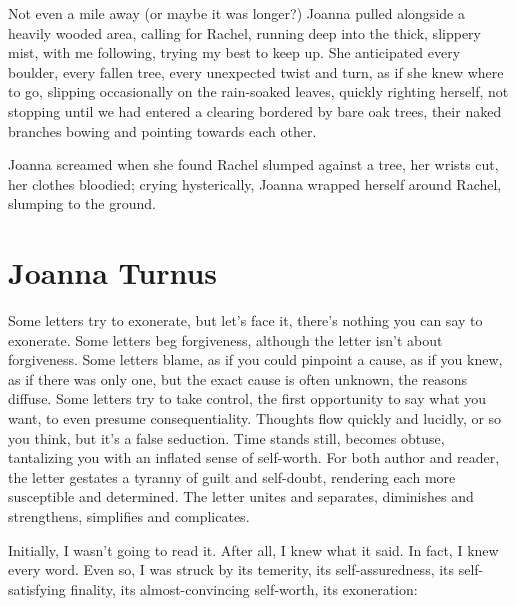 Not even a mile away (or maybe it was longer?) Joanna pulled alongside a
heavily wooded area, calling for Rachel, running deep into the thick,
slippery mist, with me following, trying my best to keep up. She
anticipated every boulder, every fallen tree, every unexpected twist and
turn, as if she knew where to go, slipping occasionally on the
rain-soaked leaves, quickly righting herself, not stopping until we had
entered a clearing bordered by bare oak trees, their naked branches
bowing and pointing towards each other.

Joanna screamed when she found Rachel slumped against a tree, her wrists
cut, her clothes bloodied; crying hysterically, Joanna wrapped herself
around Rachel, slumping to the ground.

\chapter{Joanna Turnus}

\titlemark

Some letters try to exonerate, but let's face it, there's nothing you
can say to exonerate. Some letters beg forgiveness, although the letter
isn't about forgiveness. Some letters blame, as if you could pinpoint a
cause, as if you knew, as if there was only one, but the exact cause is
often unknown, the reasons diffuse. Some letters try to take control,
the first opportunity to say what you want, to even presume
consequentiality. Thoughts flow quickly and lucidly, or so you think,
but it's a false seduction. Time stands still, becomes obtuse,
tantalizing you with an inflated sense of self-worth. For both author
and reader, the letter gestates a tyranny of guilt and self-doubt,
rendering each more susceptible and determined. The letter unites and
separates, diminishes and strengthens, simplifies and complicates.

Initially, I wasn't going to read it. After all, I knew what it said. In
fact, I knew every word. Even so, I was struck by its temerity, its
self-assuredness, its self-satisfying finality, its almost-convincing
self-worth, its exoneration:

